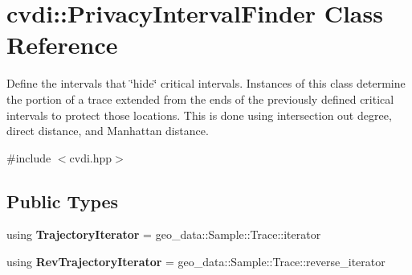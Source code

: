 \hypertarget{classcvdi_1_1PrivacyIntervalFinder}{}\section{cvdi\+:\+:Privacy\+Interval\+Finder Class Reference}
\label{classcvdi_1_1PrivacyIntervalFinder}


Define the intervals that \char`\"{}hide\char`\"{} critical intervals. Instances of this class determine the portion of a trace extended from the ends of the previously defined critical intervals to protect those locations. This is done using intersection out degree, direct distance, and Manhattan distance.  




{\ttfamily \#include $<$cvdi.\+hpp$>$}

\subsection*{Public Types}
\begin{DoxyCompactItemize}
\item 
using {\bfseries Trajectory\+Iterator} = geo\+\_\+data\+::\+Sample\+::\+Trace\+::iterator\hypertarget{classcvdi_1_1PrivacyIntervalFinder_a82dfa8f6018349f3e430fd842e2a17cc}{}\label{classcvdi_1_1PrivacyIntervalFinder_a82dfa8f6018349f3e430fd842e2a17cc}

\item 
using {\bfseries Rev\+Trajectory\+Iterator} = geo\+\_\+data\+::\+Sample\+::\+Trace\+::reverse\+\_\+iterator\hypertarget{classcvdi_1_1PrivacyIntervalFinder_aed4483689c32d185a5fa2f5c7d387700}{}\label{classcvdi_1_1PrivacyIntervalFinder_aed4483689c32d185a5fa2f5c7d387700}

\end{DoxyCompactItemize}
